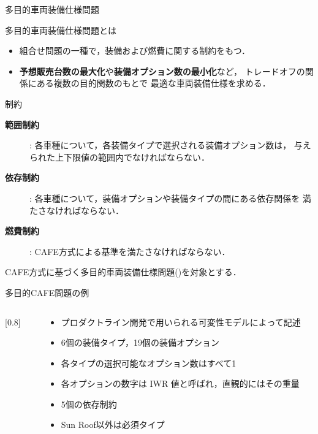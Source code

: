 \documentclass[dvipdfmx, 11pt]{beamer}
\begin{document}
\begin{frame}{多目的車両装備仕様問題}
 \begin{alertblock}{多目的車両装備仕様問題とは}
  \begin{itemize}
   \item 組合せ問題の一種で，装備および燃費に関する制約をもつ．
   \item {\bf 予想販売台数の最大化}や{\bf 装備オプション数の最小化}など，
	 トレードオフの関係にある複数の目的関数のもとで
	 最適な車両装備仕様を求める．
  \end{itemize}
 \end{alertblock}
 \begin{block}{制約}
  \begin{description}
   \item[{\bf 範囲制約}]: 各車種について，各装備タイプで選択される装備オプション数は，
	      与えられた上下限値の範囲内でなければならない．
   \item[{\bf 依存制約}]: 各車種について，装備オプションや装備タイプの間にある依存関係を
	      満たさなければならない．
   \item[{\bf 燃費制約}]: CAFE方式による基準を満たさなければならない．
  \end{description}
 \end{block}
 CAFE方式に基づく多目的車両装備仕様問題()を対象とする．
\end{frame}
\begin{frame}{多目的CAFE問題の例}

  \begin{columns}
    \begin{column}{0.75\linewidth}
      \scalebox{0.8}[0.8]{}
    \end{column}
    \begin{column}{0.25\linewidth}
      \begin{footnotesize}
        \begin{itemize}
        \item プロダクトライン開発で用いられる可変性モデルによって記述
        \item 6個の装備タイプ，19個の装備オプション
        \item 各タイプの選択可能なオプション数はすべて1
        \item 各オプションの数字は IWR 値と呼ばれ，直観的にはその重量
        \item 5個の依存制約
        \item \textsf{Sun Roof}以外は必須タイプ
        \end{itemize}
      \end{footnotesize}
    \end{column}
  \end{columns}
\end{frame}
\end{document}
